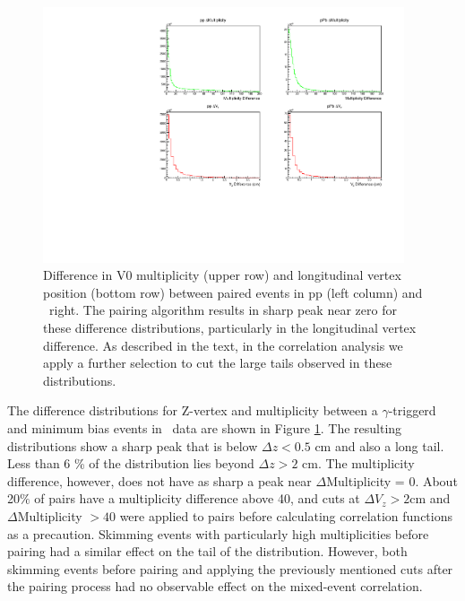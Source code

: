 \begin{figure}[h]
\center
\includegraphics[width=0.95\textwidth]{Data_Analysis/EventMixing/pPb_Differences.pdf}
\caption{Difference in V0 multiplicity
(upper row) and longitudinal vertex position (bottom row) between paired events in pp (left column) and \pPb~right. The pairing algorithm results in sharp peak near zero for these difference distributions, particularly in the longitudinal vertex difference. As described in the text, in the correlation analysis we apply a further selection to cut the large tails observed in these distributions. }
\label{Difference_distributions}
\end{figure}

The difference distributions for Z-vertex and multiplicity between a \(\gamma\)-triggerd and minimum bias events in \pPb~data are shown in Figure \ref{Difference_distributions}. The resulting distributions show a sharp peak that is below {$\Delta z<0.5$ cm} and also a long tail. Less than 6 \% of the distribution lies beyond $\Delta z > 2$ cm. The multiplicity difference, however, does not have as sharp a peak near \(\Delta\)Multiplicity = 0. About 20$\%$ of pairs have a multiplicity difference above 40, and cuts at \(\Delta V_z > 2\)cm and \(\Delta\)Multiplicity \(> 40\) were applied to pairs before calculating correlation functions as a precaution.
 Skimming \pPb events with particularly high multiplicities before pairing had a similar effect on the tail of the distribution. However, both skimming events before pairing and applying the previously mentioned cuts after the pairing process had no observable effect on the mixed-event correlation.



